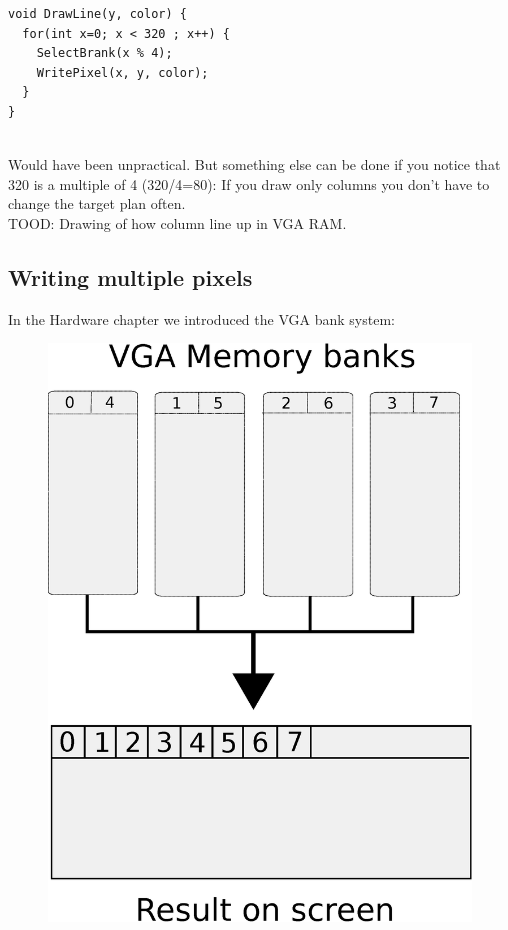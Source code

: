\begin{verbatim}
void DrawLine(y, color) {
  for(int x=0; x < 320 ; x++) {
    SelectBrank(x % 4);
    WritePixel(x, y, color);   
  }
}
\end{verbatim}\\
Would have been unpractical. But something else can be done if you notice that 320 is a multiple of 4 (320/4=80): If you draw only columns you don't have to change the target plan often.\\
TOOD: Drawing of how column line up in VGA RAM.\\





\subsection{Writing multiple pixels}
In the Hardware chapter we introduced the VGA bank system:
\begin{figure}[H]
\centering
\includegraphics[scale=0.5]{imgs/vga_ram_screen_layout.eps}
\end{figure}

